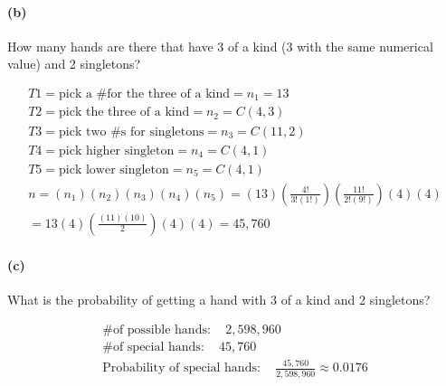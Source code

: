     \paragraph*{(b)}
    How many hands are there that have 3 of a kind (3 with the same numerical value) and 2 singletons?

    \begin{mdframed}
        \begin{equation*}
            \begin{gathered}
                T1 = \text{pick a \# for the three of a kind}     = n_1  = 13    \\
                T2 = \text{pick the three of a kind}  = n_2  = C(4,3)     \\
                T3 = \text{pick two \#s for singletons}  = n_3  = C(11, 2)   \\
                T4 = \text{pick higher singleton} = n_4 = C(4,1)    \\
                T5 = \text{pick lower singleton} = n_5 = C(4,1) \\
                n = (n_1)(n_2)(n_3)(n_4)(n_5) = (13)(\frac{4!}{3!(1!)})(\frac{11!}{2!(9!)})(4)(4)   \\
                = 13(4)(\frac{(11)(10)}{2})(4)(4) = \boxed{45,760}
            \end{gathered}
        \end{equation*}
    \end{mdframed}

    \paragraph*{(c)}
    What is the probability of getting a hand with 3 of a kind and 2 singletons?

    \begin{mdframed}
        \begin{equation*}
            \begin{gathered}
                \text{\# of possible hands}: \quad 2,598,960    \\
                \text{\# of special hands}: \quad 45,760        \\
                \text{Probability of special hands}: \quad \frac{45,760}{2,598,960} \approx \boxed{0.0176}
            \end{gathered}
        \end{equation*}
    \end{mdframed}

    \pagebreak

